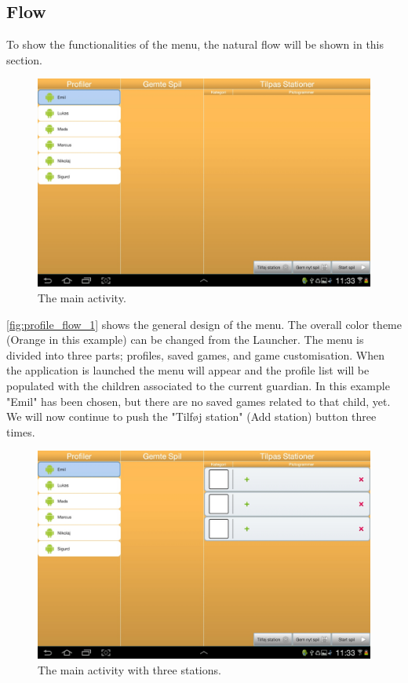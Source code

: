 \subsection{Flow}
To show the functionalities of the menu, the natural flow will be shown in this section.
\begin{figure}[H]
\centering
\includegraphics[width=1.0\linewidth]{img/screenshots/profile_flow_1.jpg}%
\caption{The main activity.}
\label{fig:profile_flow_1}
\end{figure}
\autoref{fig:profile_flow_1} shows the general design of the menu. The overall color theme (Orange in this example) can be changed from the Launcher. The menu is divided into three parts; profiles, saved games, and game customisation. When the application is launched the menu will appear and the profile list will be populated with the children associated to the current guardian. In this example "Emil" has been chosen, but there are no saved games related to that child, yet.
We will now continue to push the "Tilføj station" (Add station) button three times.

\begin{figure}[H]
\centering
\includegraphics[width=1.0\linewidth]{img/screenshots/profile_flow_2.jpg}%
\caption{The main activity with three stations.}
\label{fig:profile_flow_2}
\end{figure}

